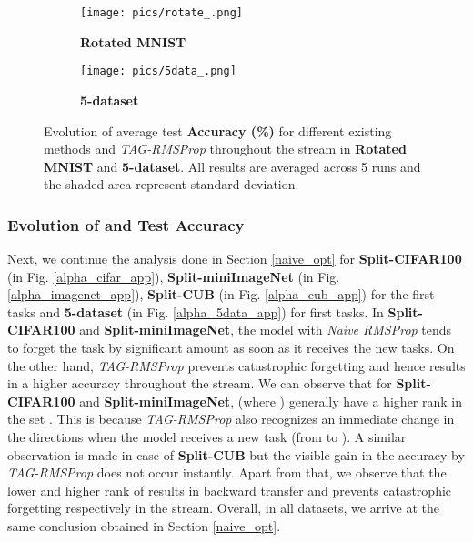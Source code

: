 \documentclass{article} \usepackage{collas2022_conference,times}
\begin{document}
\begin{figure}[h!]
            \centering
        \begin{subfigure}[b]{0.45\textwidth}
            \texttt{[image: pics/rotate\_.png]}
            \caption{\textbf{Rotated MNIST}}\label{sota_rotate_}
        \end{subfigure}
        \hfill
        \begin{subfigure}[b]{0.45\textwidth}
            \texttt{[image: pics/5data\_.png]}
            \caption{\textbf{5-dataset}}\label{sota_5data_}
        \end{subfigure}

\caption{Evolution of average test \textbf{Accuracy (\%)}  for different existing methods and \textit{TAG-RMSProp} throughout the stream in \textbf{Rotated MNIST} and \textbf{5-dataset}. All results are averaged across 5 runs and the shaded area represent standard deviation.}
        \label{sota_5data}
    \end{figure}








\subsubsection{Evolution of  and Test Accuracy } \label{alpha_app}
    Next, we continue the analysis done in Section \ref{naive_opt} for \textbf{Split-CIFAR100} (in Fig. \ref{alpha_cifar_app}), \textbf{Split-miniImageNet}  (in Fig. \ref{alpha_imagenet_app}), \textbf{Split-CUB} (in Fig. \ref{alpha_cub_app}) for the first  tasks and \textbf{5-dataset} (in Fig. \ref{alpha_5data_app}) for first  tasks. In \textbf{Split-CIFAR100} and \textbf{Split-miniImageNet}, the model with \textit{Naive RMSProp} tends to forget the task  by significant amount as soon as it receives the new tasks. On the other hand, \textit{TAG-RMSProp} prevents catastrophic forgetting and hence results in a higher accuracy throughout the stream. We can observe that for \textbf{Split-CIFAR100} and \textbf{Split-miniImageNet},  (where ) generally have a higher rank in the set . This is because \textit{TAG-RMSProp} also recognizes an immediate change in the directions when the model receives a new task (from  to ). A similar observation is made in case of \textbf{Split-CUB} but the visible gain in the accuracy by \textit{TAG-RMSProp} does not occur instantly. Apart from that, we observe that the lower and higher rank of  results in backward transfer and prevents catastrophic forgetting respectively in the stream. Overall, in all datasets, we arrive at the same conclusion obtained in Section \ref{naive_opt}. 
\end{document}
